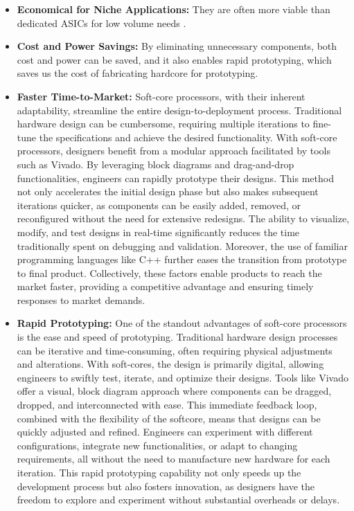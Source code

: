 \documentclass[conference]{IEEEtran}
\begin{document}
\begin{itemize}
   \item \textbf{Economical for Niche Applications:} They are often more viable than dedicated ASICs for low volume needs \cite{3}.

   
    \item \textbf{Cost and Power Savings:} By eliminating unnecessary components, both cost and power can be saved, and it also enables rapid prototyping, which saves us the cost of fabricating hardcore for prototyping.
    
    \item \textbf{Faster Time-to-Market:} Soft-core processors, with their inherent adaptability, streamline the entire design-to-deployment process. Traditional hardware design can be cumbersome, requiring multiple iterations to fine-tune the specifications and achieve the desired functionality. With soft-core processors, designers benefit from a modular approach facilitated by tools such as Vivado. By leveraging block diagrams and drag-and-drop functionalities, engineers can rapidly prototype their designs. This method not only accelerates the initial design phase but also makes subsequent iterations quicker, as components can be easily added, removed, or reconfigured without the need for extensive redesigns. The ability to visualize, modify, and test designs in real-time significantly reduces the time traditionally spent on debugging and validation. Moreover, the use of familiar programming languages like C++ further eases the transition from prototype to final product. Collectively, these factors enable products to reach the market faster, providing a competitive advantage and ensuring timely responses to market demands.
\item \textbf{Rapid Prototyping:} One of the standout advantages of soft-core processors is the ease and speed of prototyping. Traditional hardware design processes can be iterative and time-consuming, often requiring physical adjustments and alterations. With soft-cores, the design is primarily digital, allowing engineers to swiftly test, iterate, and optimize their designs. Tools like Vivado offer a visual, block diagram approach where components can be dragged, dropped, and interconnected with ease. This immediate feedback loop, combined with the flexibility of the softcore, means that designs can be quickly adjusted and refined. Engineers can experiment with different configurations, integrate new functionalities, or adapt to changing requirements, all without the need to manufacture new hardware for each iteration. This rapid prototyping capability not only speeds up the development process but also fosters innovation, as designers have the freedom to explore and experiment without substantial overheads or delays.

\end{itemize}
\end{document}
